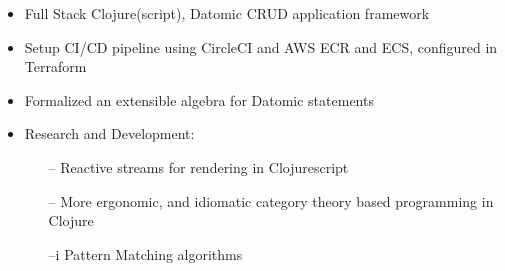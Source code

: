 \documentclass[10pt,a4paper]{altacv}
\begin{document}


\begin{fullwidth}
\makecvheader
\end{fullwidth}

\begin{quote}

\end{quote}


\begin{itemize}
  \item Full Stack Clojure(script), Datomic CRUD application framework
  \item Setup CI/CD pipeline using CircleCI and AWS ECR and ECS, configured in Terraform
  \item Formalized an extensible algebra for Datomic statements
  \item Research and Development:
    \begin{itemize}
      \item[--] Reactive streams for rendering in Clojurescript
      \item[--] More ergonomic, and idiomatic category theory based programming in Clojure
      \item[--i] Pattern Matching algorithms
    \end{itemize}
\end{itemize}

\bigskip


\divider
\end{document}
